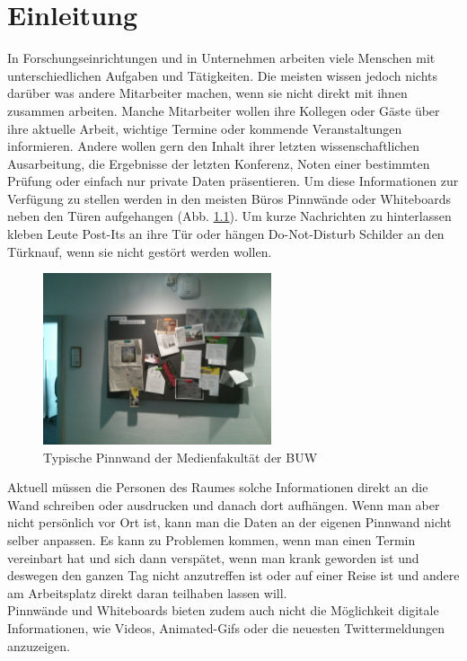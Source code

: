 \chapter{Einleitung}\label{Einleitung}
In Forschungseinrichtungen und in Unternehmen arbeiten viele Menschen mit unterschiedlichen Aufgaben und Tätigkeiten.
Die meisten wissen jedoch nichts darüber was andere Mitarbeiter machen, wenn sie nicht direkt mit ihnen zusammen arbeiten.
Manche Mitarbeiter wollen ihre Kollegen oder Gäste über ihre aktuelle Arbeit, wichtige Termine oder kommende Veranstaltungen informieren.
Andere wollen gern den Inhalt ihrer letzten wissenschaftlichen Ausarbeitung, die Ergebnisse der letzten Konferenz, Noten einer bestimmten Prüfung oder einfach nur private Daten präsentieren.
Um diese Informationen zur Verfügung zu stellen werden in den meisten Büros Pinnwände oder Whiteboards neben den Türen aufgehangen (Abb. \ref{img:pinnwand}). Um kurze Nachrichten zu hinterlassen kleben Leute Post-Its an ihre Tür oder hängen Do-Not-Disturb Schilder an den Türknauf, wenn sie nicht gestört werden wollen.\\
\begin{figure}[h!]
  \centering
    \includegraphics[width=0.6\textwidth]{./img/pinnwand.jpg}
  \caption{Typische Pinnwand der Medienfakultät der BUW}
  \label{img:pinnwand}
\end{figure}
Aktuell müssen die Personen des Raumes solche Informationen direkt an die Wand schreiben oder ausdrucken und danach dort aufhängen.
Wenn man aber nicht persönlich vor Ort ist, kann man die Daten an der eigenen Pinnwand nicht selber anpassen.
Es kann zu Problemen kommen, wenn man einen Termin vereinbart hat und sich dann verspätet, wenn man krank geworden ist und deswegen den ganzen Tag nicht anzutreffen ist oder auf einer Reise ist und andere am Arbeitsplatz direkt daran teilhaben lassen will.\\
Pinnwände und Whiteboards bieten zudem auch nicht die Möglichkeit digitale Informationen, wie Videos, Animated-Gifs oder die neuesten Twittermeldungen anzuzeigen.\\
